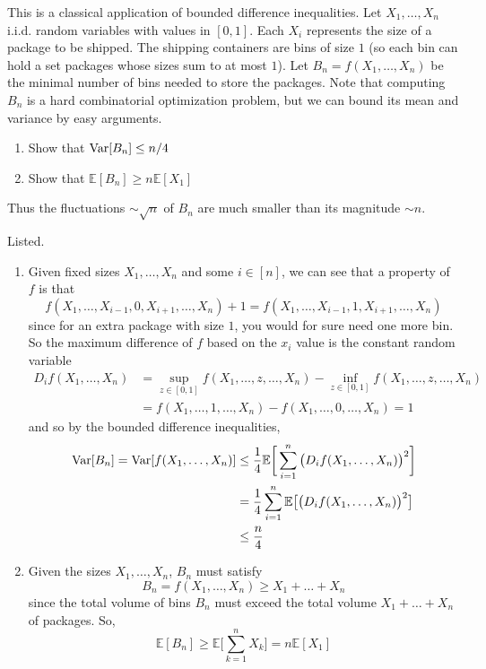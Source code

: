   \begin{exercise}
  This is a classical application of bounded difference inequalities. Let $X_1, \ldots, X_n$ i.i.d. random variables with values in $[0, 1]$. Each $X_i$ represents the size of a package to be shipped. The shipping containers are bins of size $1$ (so each bin can hold a set packages whose sizes sum to at most $1$). Let $B_n = f(X_1, \ldots, X_n)$ be the minimal number of bins needed to store the packages. Note that computing $B_n$ is a hard combinatorial optimization problem, but we can bound its mean and variance by easy arguments. 
  \begin{enumerate}
      \item Show that $\operatorname{Var}[B_n] \leq n/4$
      \item Show that $\mathbb{E}[B_n] \geq n \mathbb{E}[X_1]$
  \end{enumerate}
  Thus the fluctuations $\sim \sqrt{n}$ of $B_n$ are much smaller than its magnitude $\sim n$. 
  \end{exercise}
  \begin{solution}
  Listed. 
  \begin{enumerate}
      \item Given fixed sizes $X_1, \ldots, X_n$ and some $i \in [n]$, we can see that a property of $f$ is that 
      \[f(X_1, \ldots, X_{i-1}, 0, X_{i+1}, \ldots, X_n) + 1 = f(X_1, \ldots, X_{i-1}, 1, X_{i+1}, \ldots, X_n)\]
      since for an extra package with size $1$, you would for sure need one more bin. So the maximum difference of $f$ based on the $x_i$ value is the constant random variable 
      \begin{align*}
          D_i f(X_1, \ldots, X_n) & = \sup_{z \in [0, 1]} f(X_1, \ldots, z, \ldots, X_n) - \inf_{z \in [0, 1]} f(X_1, \ldots, z, \ldots, X_n)\\
          & = f(X_1, \ldots, 1, \ldots, X_n) - f(X_1, \ldots, 0, \ldots, X_n) = 1
      \end{align*}
      and so by the bounded difference inequalities, 
      \begin{align*}
          \operatorname{Var}[B_n] = \operatorname{Var}[f(X_1, \ldots, X_n)] & \leq \frac{1}{4} \mathbb{E} \bigg[ \sum_{i=1}^n \big( D_i f(X_1, \ldots, X_n) \big)^2 \bigg] \\
          & = \frac{1}{4} \sum_{i=1}^n \mathbb{E} \big[ \big( D_i f(X_1, \ldots, X_n) \big)^2 \big] \\
          & \leq \frac{n}{4} 
      \end{align*}
      \item Given the sizes $X_1, \ldots, X_n$, $B_n$ must satisfy 
      \[B_n = f(X_1, \ldots, X_n) \geq X_1 + \ldots + X_n\] 
      since the total volume of bins $B_n$ must exceed the total volume $X_1 + \ldots + X_n$ of packages. So, 
      \[\mathbb{E}[B_n] \geq \mathbb{E}\bigg[ \sum_{k=1}^n X_k \bigg] = n \mathbb{E}[X_1]\]
  \end{enumerate}
  \end{solution}

